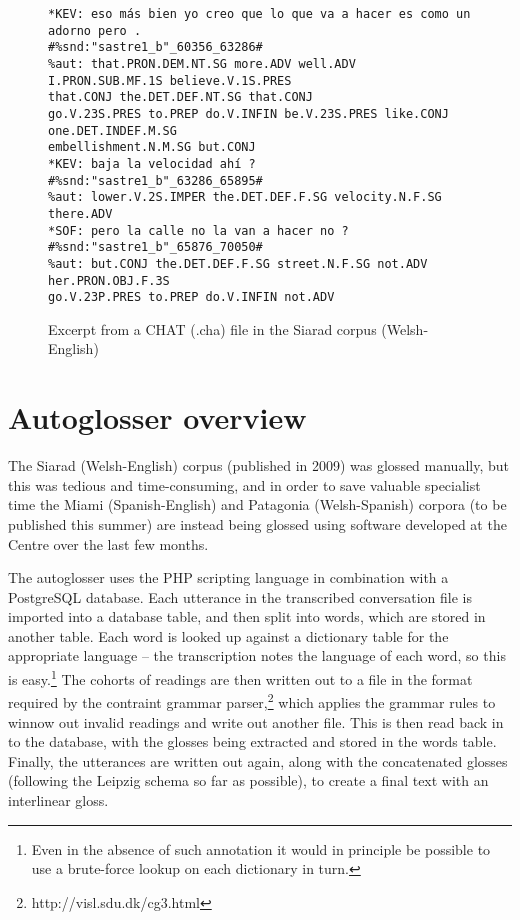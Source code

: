 \documentclass[11pt]{article}
\begin{document}
\begin{figure*} 
\begin{footnotesize}
\begin{verbatim}
*KEV: eso más bien yo creo que lo que va a hacer es como un adorno pero . 
#%snd:"sastre1_b"_60356_63286#
%aut: that.PRON.DEM.NT.SG more.ADV well.ADV I.PRON.SUB.MF.1S believe.V.1S.PRES 
that.CONJ the.DET.DEF.NT.SG that.CONJ 
go.V.23S.PRES to.PREP do.V.INFIN be.V.23S.PRES like.CONJ one.DET.INDEF.M.SG 
embellishment.N.M.SG but.CONJ
*KEV: baja la velocidad ahí ? #%snd:"sastre1_b"_63286_65895#
%aut: lower.V.2S.IMPER the.DET.DEF.F.SG velocity.N.F.SG there.ADV
*SOF: pero la calle no la van a hacer no ? #%snd:"sastre1_b"_65876_70050#
%aut: but.CONJ the.DET.DEF.F.SG street.N.F.SG not.ADV her.PRON.OBJ.F.3S 
go.V.23P.PRES to.PREP do.V.INFIN not.ADV 
\end{verbatim}
\end{footnotesize}
\caption{Excerpt from a CHAT (.cha) file in the Siarad corpus (Welsh-English)}
\label{chat_file2}
\end{figure*}

\section{Autoglosser overview}
\label{sec:autoglosser}

The Siarad (Welsh-English) corpus (published in 2009) was glossed manually, but this was tedious and time-consuming, and in order to save valuable specialist time the Miami (Spanish-English) and Patagonia (Welsh-Spanish) corpora (to be published this summer) are instead being glossed using software developed at the Centre over the last few months.

The autoglosser uses the PHP scripting language in combination with a PostgreSQL database.  Each utterance in the transcribed conversation file is imported into a database table, and then split into words, which are stored in another table.  Each word is looked up against a dictionary table for the appropriate language -- the transcription notes the language of each word, so this is easy.\footnote{Even in the absence of such annotation it would in principle be possible to use a brute-force lookup on each dictionary in turn.}  The cohorts of readings are then written out to a file in the format required by the contraint grammar parser,\footnote{http://visl.sdu.dk/cg3.html} which applies the grammar rules to winnow out invalid readings and write out another file.  This is then read back in to the database, with the glosses being extracted and stored in the words table.  Finally, the utterances are written out again, along with the concatenated glosses (following the Leipzig schema \cite{leipzig2008} so far as possible), to create a final text with an interlinear gloss.
\end{document}
